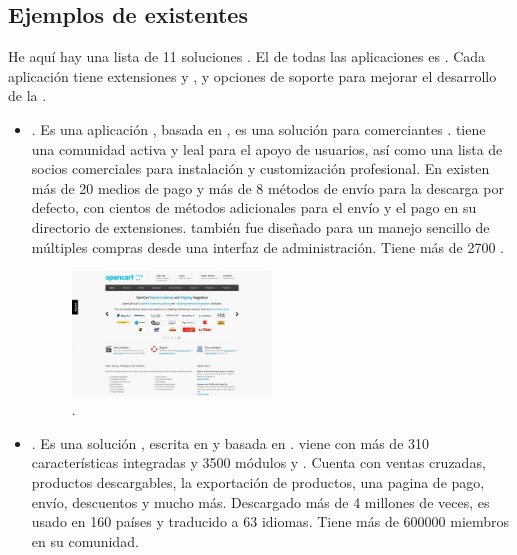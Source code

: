 \subsection{Ejemplos de \frameworksPC \ecommerceCOM existentes}

He aquí hay una lista de 11 soluciones \ecommerceCOM \openSourcePC. El \coreAS de todas las aplicaciones es \freePC. Cada aplicación tiene extensiones \freePC y \premium, y opciones de soporte para mejorar el desarrollo de la \store.

\begin{itemize}
	\item \textbf{\nameOpenCart}. Es una aplicación \openSourcePC, basada en \phpNAME, es una solución \ecommerceCOM para comerciantes \online. \nameOpenCart tiene una comunidad activa y leal para el apoyo de usuarios, así como una lista de socios comerciales para instalación y customización profesional. En \nameOpenCart existen más de 20 medios de pago y más de 8 métodos de envío para la descarga por defecto, con cientos de métodos adicionales para el envío y el pago en su directorio de extensiones. \nameOpenCart también fue diseñado para un manejo sencillo de múltiples compras desde una interfaz de administración. Tiene más de 2700 \themesCPT.
	
	\begin{figure}[H]
		\centering
		\includegraphics[width=0.5\textwidth]{figuras/cap1/openCartWebsite.jpg}
		\caption{\nameOpenCart \websiteINT \cite{online_OpenCartWebsite}.}
	\end{figure}


	\item \textbf{\namePrestaShop}. Es una solución \ecommerceCOM \openSourcePC, escrita en \phpNAME y basada en \smartyTemplateEngine. \namePrestaShop viene con más de 310 características integradas y 3500 módulos y \templatesAS. Cuenta con ventas cruzadas, productos descargables, la exportación de productos, una pagina de pago, envío, descuentos y mucho más. Descargado más de 4 millones de veces, \namePrestaShop es usado en 160 países y traducido a 63 idiomas. Tiene más de 600000 miembros en su comunidad.


\end{itemize}
